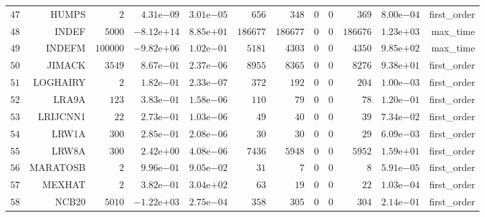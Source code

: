 \begin{longtable}{rrrrrrrrrrrr}
  \(    47\) & HUMPS & \(     2\) & \( 4.31\)e\(-09\) & \( 3.01\)e\(-05\) & \(   656\) & \(   348\) & \(     0\) & \(     0\) & \(   369\) & \( 8.00\)e\(-04\) & first\_order \\
  \(    48\) & INDEF & \(  5000\) & \(-8.12\)e\(+14\) & \( 8.85\)e\(+01\) & \(186677\) & \(186677\) & \(     0\) & \(     0\) & \(186676\) & \( 1.23\)e\(+03\) & max\_time \\
  \(    49\) & INDEFM & \(100000\) & \(-9.82\)e\(+06\) & \( 1.02\)e\(-01\) & \(  5181\) & \(  4303\) & \(     0\) & \(     0\) & \(  4350\) & \( 9.85\)e\(+02\) & max\_time \\
  \(    50\) & JIMACK & \(  3549\) & \( 8.67\)e\(-01\) & \( 2.37\)e\(-06\) & \(  8955\) & \(  8365\) & \(     0\) & \(     0\) & \(  8276\) & \( 9.38\)e\(+01\) & first\_order \\
  \(    51\) & LOGHAIRY & \(     2\) & \( 1.82\)e\(-01\) & \( 2.33\)e\(-07\) & \(   372\) & \(   192\) & \(     0\) & \(     0\) & \(   204\) & \( 1.00\)e\(-03\) & first\_order \\
  \(    52\) & LRA9A & \(   123\) & \( 3.83\)e\(-01\) & \( 1.58\)e\(-06\) & \(   110\) & \(    79\) & \(     0\) & \(     0\) & \(    78\) & \( 1.20\)e\(-01\) & first\_order \\
  \(    53\) & LRIJCNN1 & \(    22\) & \( 2.73\)e\(-01\) & \( 1.03\)e\(-06\) & \(    49\) & \(    40\) & \(     0\) & \(     0\) & \(    39\) & \( 7.34\)e\(-02\) & first\_order \\
  \(    54\) & LRW1A & \(   300\) & \( 2.85\)e\(-01\) & \( 2.08\)e\(-06\) & \(    30\) & \(    30\) & \(     0\) & \(     0\) & \(    29\) & \( 6.09\)e\(-03\) & first\_order \\
  \(    55\) & LRW8A & \(   300\) & \( 2.42\)e\(+00\) & \( 4.08\)e\(-06\) & \(  7436\) & \(  5948\) & \(     0\) & \(     0\) & \(  5952\) & \( 1.59\)e\(+01\) & first\_order \\
  \(    56\) & MARATOSB & \(     2\) & \( 9.96\)e\(-01\) & \( 9.05\)e\(-02\) & \(    31\) & \(     7\) & \(     0\) & \(     0\) & \(     8\) & \( 5.91\)e\(-05\) & first\_order \\
  \(    57\) & MEXHAT & \(     2\) & \( 3.82\)e\(-01\) & \( 3.04\)e\(+02\) & \(    63\) & \(    19\) & \(     0\) & \(     0\) & \(    22\) & \( 1.03\)e\(-04\) & first\_order \\
  \(    58\) & NCB20 & \(  5010\) & \(-1.22\)e\(+03\) & \( 2.75\)e\(-04\) & \(   358\) & \(   305\) & \(     0\) & \(     0\) & \(   304\) & \( 2.14\)e\(-01\) & first\_order \\

\end{longtable}
